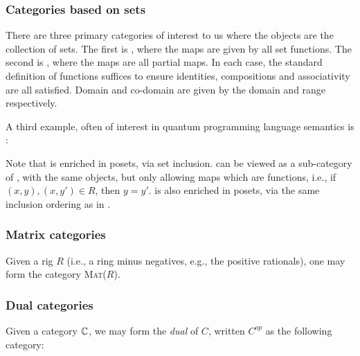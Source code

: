 \subsubsection{Categories based on sets} %
\label{ssub:categories_based_on_sets}
There are three primary categories of interest to us where the objects are the collection of sets.
The first is \sets, where the maps are given by all set functions. The second is \Par, where the
maps are all partial maps. In each case, the standard definition of functions suffices to ensure
identities, compositions and associativity are all satisfied. Domain and co-domain are given by the
domain and range respectively.

A third example, often of interest in quantum programming language semantics is \rel:

Note that \rel is enriched in posets, via set inclusion. \Par can be viewed as a sub-category of
\rel, with the same objects, but only allowing maps which are functions, i.e., if $(x,y), (x,y')
\in R$, then $y = y'$. \Par is also enriched in posets, via the same inclusion ordering as in \rel.

\subsubsection{Matrix categories} %
\label{ssub:matrix_categories}
Given a rig $R$ (i.e., a ring minus negatives, e.g., the positive rationals), one may form the
category \textsc{Mat}($R$).

\subsubsection{Dual categories} %
\label{ssub:dual_categories}

Given a category $\mathbb{C}$, we may form the \emph{dual} of $C$, written $C^{op}$ as the following
category:


